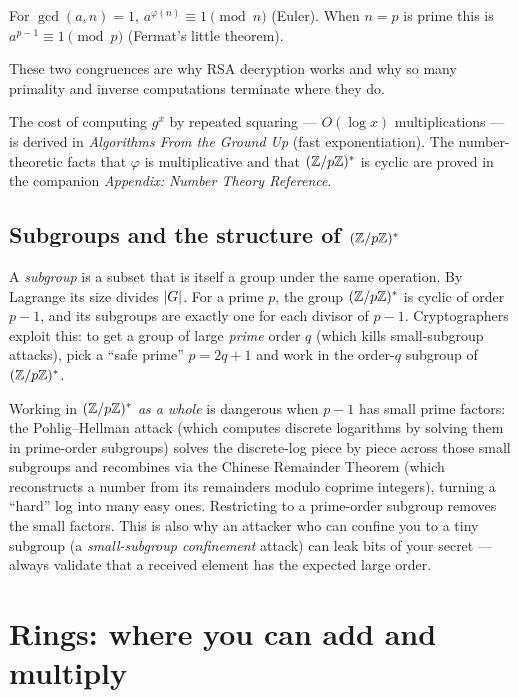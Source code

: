 \begin{corollary}
\label{ch41:cor-euler}
For $\gcd(a,n)=1$, $a^{\varphi(n)} \equiv 1 \pmod n$ (Euler). When $n=p$ is prime
this is $a^{p-1}\equiv 1 \pmod p$ (Fermat's little theorem).
\end{corollary}

These two congruences are why RSA decryption works and why so many primality and
inverse computations terminate where they do.

\begin{connectionbox}
The cost of computing $g^x$ by repeated squaring --- $O(\log x)$ multiplications
--- is derived in \emph{Algorithms From the Ground Up} (fast exponentiation). The
number-theoretic facts that $\varphi$ is multiplicative and that $(\mathbb{Z}/p\mathbb{Z})^{*}$ is
cyclic are proved in the companion \emph{Appendix: Number Theory Reference}.
\end{connectionbox}

\subsection{Subgroups and the structure of $(\mathbb{Z}/p\mathbb{Z})^{*}$}

A \emph{subgroup} is a subset that is itself a group under the same operation. By
Lagrange its size divides $\lvert G\rvert$. For a prime $p$, the group $(\mathbb{Z}/p\mathbb{Z})^{*}$ is
cyclic of order $p-1$, and its subgroups are exactly one for each divisor of
$p-1$. Cryptographers exploit this: to get a group of large \emph{prime} order $q$
(which kills small-subgroup attacks), pick a ``safe prime'' $p=2q+1$ and work in
the order-$q$ subgroup of $(\mathbb{Z}/p\mathbb{Z})^{*}$.

\begin{trapbox}
Working in $(\mathbb{Z}/p\mathbb{Z})^{*}$ \emph{as a whole} is dangerous when $p-1$ has small prime
factors: the Pohlig--Hellman attack (which computes discrete logarithms by solving them in prime-order subgroups) solves the discrete-log piece by piece across
those small subgroups and recombines via the Chinese Remainder Theorem (which reconstructs a number from its remainders modulo coprime integers), turning a
``hard'' log into many easy ones. Restricting to a prime-order subgroup removes the
small factors. This is also why an attacker who can confine you to a tiny subgroup
(a \emph{small-subgroup confinement} attack) can leak bits of your secret ---
always validate that a received element has the expected large order.
\end{trapbox}

\section{Rings: where you can add and multiply}
\label{ch41:rings}

